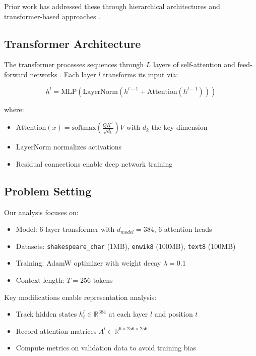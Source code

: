 \documentclass{article} %
\begin{document}
Prior work has addressed these through hierarchical architectures \citep{Hwang2016CharacterlevelLM} and transformer-based approaches \citep{Al-Rfou2018CharacterLevelLM}.

\subsection{Transformer Architecture}
The transformer processes sequences through $L$ layers of self-attention and feed-forward networks \citep{vaswani2017attention}. Each layer $l$ transforms its input via:

\begin{equation}
    h^l = \text{MLP}(\text{LayerNorm}(h^{l-1} + \text{Attention}(h^{l-1})))
\end{equation}

where:
\begin{itemize}
    \item $\text{Attention}(x) = \text{softmax}(\frac{QK^T}{\sqrt{d_k}})V$ with $d_k$ the key dimension
    \item $\text{LayerNorm}$ normalizes activations \citep{ba2016layer}
    \item Residual connections enable deep network training
\end{itemize}

\subsection{Problem Setting}
Our analysis focuses on:
\begin{itemize}
    \item Model: 6-layer transformer with $d_{model}=384$, 6 attention heads
    \item Datasets: \texttt{shakespeare\_char} (1MB), \texttt{enwik8} (100MB), \texttt{text8} (100MB)
    \item Training: AdamW optimizer \citep{loshchilov2017adamw} with weight decay $\lambda=0.1$
    \item Context length: $T=256$ tokens
\end{itemize}

Key modifications enable representation analysis:
\begin{itemize}
    \item Track hidden states $h^l_t \in \mathbb{R}^{384}$ at each layer $l$ and position $t$
    \item Record attention matrices $A^l \in \mathbb{R}^{6 \times 256 \times 256}$
    \item Compute metrics on validation data to avoid training bias
\end{itemize}
\end{document}
